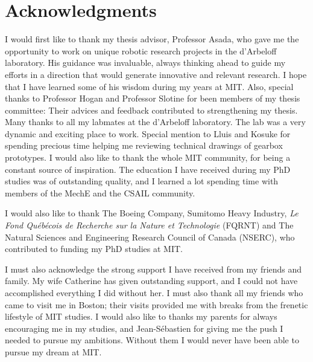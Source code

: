 \section*{Acknowledgments}


I would first like to thank my thesis advisor, Professor Asada, who gave me the opportunity to work on unique robotic research projects in the d'Arbeloff laboratory. His guidance was invaluable, always thinking ahead to guide my efforts in a direction that would generate innovative and relevant research. I hope that I have learned some of his wisdom during my years at MIT. Also, special thanks to Professor Hogan and Professor Slotine for been members of my thesis committee: Their advices and feedback contributed to strengthening my thesis. Many thanks to all my labmates at the d'Arbeloff laboratory. The lab was a very dynamic and exciting place to work. Special mention to Lluis and Kosuke for spending precious time helping me reviewing technical drawings of gearbox prototypes. I would also like to thank the whole MIT community, for being a constant source of inspiration. The education I have received during my PhD studies was of outstanding quality, and I learned a lot spending time with members of the MechE and the CSAIL community.

I would also like to thank The Boeing Company, Sumitomo Heavy Industry, \textit{Le Fond Qu\'{e}b\'{e}cois de Recherche sur la Nature et Technologie} (FQRNT) and The Natural Sciences and Engineering Research Council of Canada (NSERC), who contributed to funding my PhD studies at MIT.

I must also acknowledge the strong support I have received from my friends and family. My wife Catherine has given outstanding support, and I could not have accomplished everything I did without her. I must also thank all my friends who came to visit me in Boston; their visits provided me with breaks from the frenetic lifestyle of MIT studies. I would also like to thanks my parents for always encouraging me in my studies, and Jean-S\'{e}bastien for giving me the push I needed to pursue my ambitions. Without them I would never have been able to pursue my dream at MIT. 
